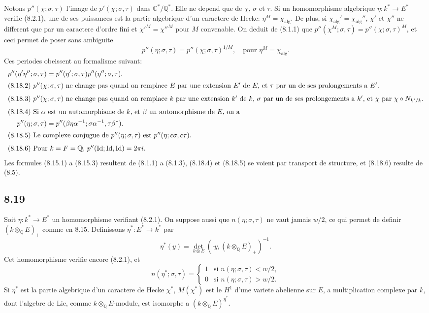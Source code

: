 \documentclass[12pt,a4paper]{article}
\theoremstyle{plain}
\theoremstyle{definition}
\theoremstyle{remark}
\newcommand{\Q}{\mathbb{Q}}
\newcommand{\C}{\mathbb{C}}
\begin{document}
Notons $p''(\chi; \sigma, \tau)$ l'image de $p'(\chi; \sigma, \tau)$ dans $\C^*/\Q^*$. Elle ne depend que
de $\chi$, $\sigma$ et $\tau$. Si un homomorphisme algebrique $\eta: k^* \to E^*$ verifie (8.2.1),
une de ses puissances est la partie algebrique d'un caractere de Hecke: $\eta^M = \chi_{\text{alg}}$.
De plus, si $\chi_{\text{alg}}' = \chi_{\text{alg}}''$, $\chi'$ et $\chi''$ ne different que par un caractere d'ordre
fini et $\chi'^M = \chi''^M$ pour $M$ convenable. On deduit de (8.1.1) que
$p''(\chi^M; \sigma, \tau) = p''(\chi; \sigma, \tau)^M$, et ceci permet de poser sans ambiguite
\[
p''(\eta; \sigma, \tau) = p''(\chi; \sigma, \tau)^{1/M}, \quad \text{pour } \eta^M = \chi_{\text{alg}}.
\]
Ces periodes obeissent au formalisme suivant:
\begin{align}
p''(\eta' \eta''; \sigma, \tau) &= p''(\eta'; \sigma, \tau) p''(\eta''; \sigma, \tau). \\
\intertext{(8.18.2) $p''(\chi; \sigma, \tau)$ ne change pas quand on remplace $E$ par une extension
$E'$ de $E$, et $\tau$ par un de ses prolongements a $E'$.}
\intertext{(8.18.3) $p''(\chi; \sigma, \tau)$ ne change pas quand on remplace $k$ par une extension
$k'$ de $k$, $\sigma$ par un de ses prolongements a $k'$, et $\chi$ par $\chi \circ N_{k'/k}$.}
\intertext{(8.18.4) Si $\alpha$ est un automorphisme de $k$, et $\beta$ un automorphisme de $E$, on a}
p''(\eta; \sigma, \tau) &= p''(\beta \eta \alpha^{-1}; \sigma \alpha^{-1}, \tau \beta^*). \\
\intertext{(8.18.5) Le complexe conjugue de $p''(\eta; \sigma, \tau)$ est $p''(\eta; c\sigma, c\tau)$.}
\intertext{(8.18.6) Pour $k = F = \Q$, $p''(\text{Id}; \text{Id}, \text{Id}) = 2\pi i$.}
\end{align}
Les formules (8.15.1) a (8.15.3) resultent de (8.1.1) a (8.1.3), (8.18.4) et (8.18.5)
se voient par transport de structure, et (8.18.6) resulte de (8.5).

\subsection*{8.19}

Soit $\eta: k^* \to E^*$ un homomorphisme verifiant (8.2.1). On suppose aussi
que $n(\eta; \sigma, \tau)$ ne vaut jamais $w/2$, ce qui permet de definir $(k \otimes_\Q E)_+$
comme en 8.15. Definissons $\eta^*: E^* \to k^*$ par
\[
\eta^*(y) = \det_{k \otimes E}(\cdot y, (k \otimes_\Q E)_+)^{-1}.
\]
Cet homomorphisme verifie encore (8.2.1), et
\[
n(\eta^*; \sigma, \tau) =
\begin{cases}
1 & \text{si } n(\eta; \sigma, \tau) < w/2,\\
0 & \text{si } n(\eta; \sigma, \tau) > w/2.
\end{cases}
\]
Si $\eta^*$ est la partie algebrique d'un caractere de Hecke $\chi^*$, $M(\chi^*)$ est le $H^1$
d'une variete abelienne sur $E$, a multiplication complexe par $k$, dont l'algebre de
Lie, comme $k \otimes_\Q E$-module, est isomorphe a $(k \otimes_\Q E)^{\eta^*}$.
\end{document}
